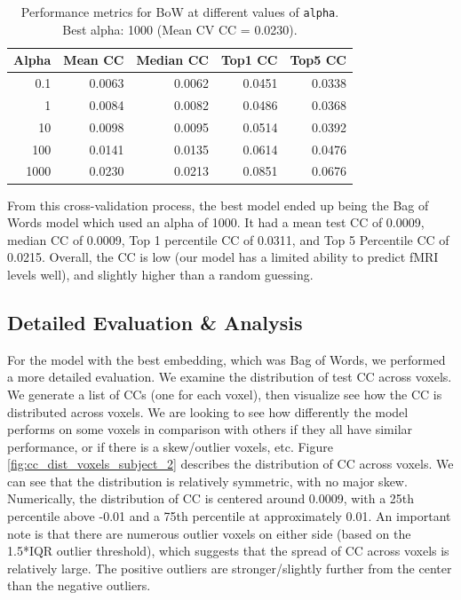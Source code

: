 \documentclass[10pt,letterpaper]{article}
\begin{document}
\begin{table}[ht]
\centering
\caption{Performance metrics for BoW at different values of \texttt{alpha}. Best alpha: 1000 (Mean CV CC = 0.0230).}
\label{tab:bow_cv}
\begin{tabular}{rrrrr}
\toprule
\textbf{Alpha} & \textbf{Mean CC} & \textbf{Median CC} & \textbf{Top1 CC} & \textbf{Top5 CC} \\
\midrule
0.1    & 0.0063 & 0.0062 & 0.0451 & 0.0338 \\
1      & 0.0084 & 0.0082 & 0.0486 & 0.0368 \\
10     & 0.0098 & 0.0095 & 0.0514 & 0.0392 \\
100    & 0.0141 & 0.0135 & 0.0614 & 0.0476 \\
1000   & 0.0230 & 0.0213 & 0.0851 & 0.0676 \\
\bottomrule
\end{tabular}
\end{table}




From this cross-validation process, the best model ended up being the Bag of Words model which used an alpha of 1000. It had a mean test CC of 0.0009, median CC of 0.0009, Top 1 percentile CC of 0.0311, and Top 5 Percentile CC of 0.0215. Overall, the CC is low (our model has a limited ability to predict fMRI levels well), and slightly higher than a random guessing.



\subsection{Detailed Evaluation \& Analysis}
For the model with the best embedding, which was Bag of Words, we performed a more detailed evaluation. We examine the distribution of test CC across voxels. We generate a list of CCs (one for each voxel), then visualize see how the CC is distributed across voxels. We are looking to see how differently the model performs on some voxels in comparison with others if they all have similar performance, or if there is a skew/outlier voxels, etc. Figure \ref{fig:cc_dist_voxels_subject_2} describes the distribution of CC across voxels. We can see that the distribution is relatively symmetric, with no major skew. Numerically, the distribution of CC is centered around 0.0009, with a 25th percentile above -0.01 and a 75th percentile at approximately 0.01. An important note is that there are numerous outlier voxels on either side (based on the 1.5*IQR outlier threshold), which suggests that the spread of CC across voxels is relatively large. The positive outliers are stronger/slightly further from the center than the negative outliers.
\end{document}
